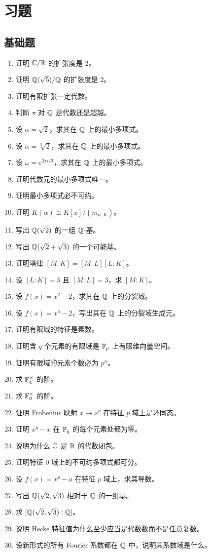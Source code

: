\section*{习题}

\subsection*{基础题}
\begin{enumerate}[label=\textbf{\arabic*.}, leftmargin=*, itemsep=0.5em]
\item \basic 证明 $\mathbb{C}/\mathbb{R}$ 的扩张度是 $2$。
\item \basic 证明 $\mathbb{Q}(\sqrt5)/\mathbb{Q}$ 的扩张度是 $2$。
\item \basic 证明有限扩张一定代数。
\item \basic 判断 $\pi$ 对 $\mathbb{Q}$ 是代数还是超越。
\item \basic 设 $\alpha=\sqrt2$，求其在 $\mathbb{Q}$ 上的最小多项式。
\item \basic 设 $\alpha=\sqrt[3]{2}$，求其在 $\mathbb{Q}$ 上的最小多项式。
\item \basic 设 $\omega=e^{2\pi i/3}$，求其在 $\mathbb{Q}$ 上的最小多项式。
\item \basic 证明代数元的最小多项式唯一。
\item \basic 证明最小多项式必不可约。
\item \basic 证明 $K(\alpha)\cong K[x]/(m_{\alpha,K})$。
\item \basic 写出 $\mathbb{Q}(\sqrt2)$ 的一组 $\mathbb{Q}$-基。
\item \basic 写出 $\mathbb{Q}(\sqrt2+\sqrt3)$ 的一个可能基。
\item \basic 证明塔律 $[M:K]=[M:L][L:K]$。
\item \basic 设 $[L:K]=5$ 且 $[M:L]=3$，求 $[M:K]$。
\item \basic 设 $f(x)=x^2-2$，求其在 $\mathbb{Q}$ 上的分裂域。
\item \basic 设 $f(x)=x^3-2$，写出其在 $\mathbb{Q}$ 上的分裂域生成元。
\item \basic 证明有限域的特征是素数。
\item \basic 证明含 $q$ 个元素的有限域是 $\mathbb{F}_p$ 上有限维向量空间。
\item \basic 证明有限域的元素个数必为 $p^n$。
\item \basic 求 $\mathbb{F}_4^\times$ 的阶。
\item \basic 求 $\mathbb{F}_9^\times$ 的阶。
\item \basic 证明 Frobenius 映射 $x\mapsto x^p$ 在特征 $p$ 域上是环同态。
\item \basic 证明 $x^q-x$ 在 $\mathbb{F}_q$ 的每个元素处都为零。
\item \basic 说明为什么 $\mathbb{C}$ 是 $\mathbb{R}$ 的代数闭包。
\item \basic 证明特征 $0$ 域上的不可约多项式都可分。
\item \basic 设 $f(x)=x^p-a$ 在特征 $p$ 域上，求其导数。
\item \basic 写出 $\mathbb{Q}(\sqrt2,\sqrt3)$ 相对于 $\mathbb{Q}$ 的一组基。
\item \basic 求 $[\mathbb{Q}(\sqrt2,\sqrt3):\mathbb{Q}]$。
\item \basic 说明 Hecke 特征值为什么至少应当是代数数而不是任意复数。
\item \basic 设新形式的所有 Fourier 系数都在 $\mathbb{Q}$ 中，说明其系数域是什么。
\end{enumerate}


